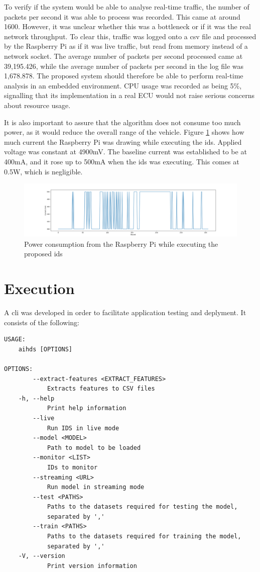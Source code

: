 To verify if the system would be able to analyse real-time traffic, the number of packets per second it was able to process was recorded. This came at around 1600. However, it was unclear whether this was a bottleneck or if it was the real network throughput. To clear this, traffic was logged onto a \gls{csv} file and processed by the Raspberry Pi as if it was live traffic, but read from memory instead of a network socket. The average number of packets per second processed came at 39,195.426, while the average number of packets per second in the log file was 1,678.878. The proposed system should therefore be able to perform real-time analysis in an embedded environment. CPU usage was recorded as being 5\%, signalling that its implementation in a real ECU would not raise serious concerns about resource usage.\par
It is also important to assure that the algorithm does not consume too much power, as it would reduce the overall range of the vehicle. Figure \ref{fig:powerdraw} shows how much current the Raspberry Pi was drawing while executing the \gls{ids}. Applied voltage was constant at 4900mV. The baseline current was established to be at 400mA, and it rose up to 500mA when the \gls{ids} was executing. This comes at 0.5W, which is negligible.

\begin{figure}
    \centering
    \includegraphics[width = \linewidth]{img/parts/app/powerdraw.png}
    \caption{Power consumption from the Raspberry Pi while executing the proposed \gls{ids}}
    \label{fig:powerdraw}
\end{figure}

\section{Execution}
\label{sec:app_exe}

A \gls{cli} was developed in order to facilitate application testing and deplyment. It consists of the following:

\begin{verbatim}
USAGE:
    aihds [OPTIONS]

OPTIONS:
        --extract-features <EXTRACT_FEATURES>
            Extracts features to CSV files
    -h, --help
            Print help information
        --live
            Run IDS in live mode
        --model <MODEL>
            Path to model to be loaded
        --monitor <LIST>
            IDs to monitor
        --streaming <URL>
            Run model in streaming mode
        --test <PATHS>
            Paths to the datasets required for testing the model,
            separated by ','
        --train <PATHS>
            Paths to the datasets required for training the model,
            separated by ','
    -V, --version
            Print version information
\end{verbatim}

